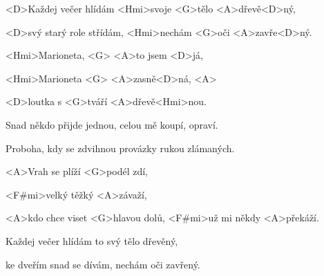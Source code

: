 
\zs
<D>Každej večer hlídám
<Hmi>svoje <G>tělo <A>dřevě<D>ný,

<D>svý starý role střídám,
<Hmi>nechám <G>oči <A>zavře<D>ný.
\ks

\zr
<Hmi>Marioneta, <G> <A>to jsem <D>já,

<Hmi>Marioneta <G> <A>zasně<D>ná, <A> 

<D>loutka s <G>tváří <A>dřevě<Hmi>nou.
\kr


\zs
Snad někdo přijde jednou,
celou mě koupí, opraví.

Proboha, kdy se zdvihnou
provázky rukou zlámaných.
\ks

\zr
\kr

\zs
<A>Vrah se plíží <G>podél zdí,

<F#mi>velký těžký <A>závaží,

<A>kdo chce viset <G>hlavou dolů,
<F#mi>už mi někdy <A>překáží.
\ks

\zs
Každej večer hlídám
to svý tělo dřevěný,

ke dveřím snad se dívám,
nechám oči zavřený.
\ks


\zr \kr
\kp
